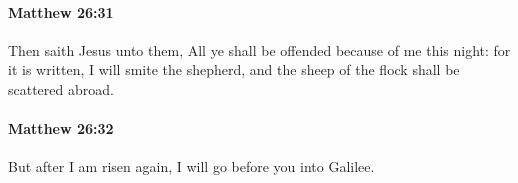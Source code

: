 		\paragraph{Matthew 26:31} %
			\label{MATTHEW-26-31}

			Then saith Jesus unto them, All ye shall be offended because of me this night: for it is written, I will smite the shepherd, and the sheep of the flock shall be scattered abroad.

			\begin{framed}
			\scriptsize
				\begin{compactdesc}
					\item[SBLG]  \hyperref[SKANDALIZO]{} 
				\end{compactdesc}
			\end{framed}

		\paragraph{Matthew 26:32} %
			\label{MATTHEW-26-32}

			But after I am risen again, I will go before you into Galilee.

